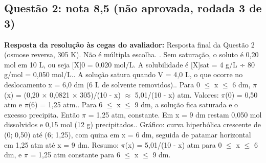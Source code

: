 \documentclass{article}%
\begin{document}
\subsection*{Questão 2: nota 8,5 (não aprovada, rodada 3 de 3)}%
\textbf{Resposta da resolução às cegas do avaliador:} Resposta final da Questão 2 (osmose reversa, 305 K). Não é múltipla escolha.\newline%
. Sem saturação, o soluto é 0,20 mol em 10 L, ou seja {[}X{]}0 = 0,020 mol/L. A solubilidade é {[}X{]}sat = 4 g/L ÷ 80 g/mol = 0,050 mol/L.. A solução satura quando V = 4,0 L, o que ocorre no deslocamento x = 6,0 dm (6 L de solvente removidos).. Para 0 $\leq$ x $\leq$ 6 dm, $\pi$(x) = (0,20 $\times$ 0,0821 $\times$ 305)/(10 - x) $\approx$ 5,01/(10 - x) atm. Valores: $\pi$(0) = 0,50 atm e $\pi$(6) = 1,25 atm.. Para 6 $\leq$ x $\leq$ 9 dm, a solução fica saturada e o excesso precipita. Então $\pi$ = 1,25 atm, constante. Em x = 9 dm restam 0,050 mol dissolvidos e 0,15 mol (12 g) precipitados.. Gráfico: curva hiperbólica crescente de (0; 0,50) até (6; 1,25), com quina em x = 6 dm, seguida de patamar horizontal em 1,25 atm até x = 9 dm.\newline%
\newline%
Resumo: $\pi$(x) = 5,01/(10 - x) atm para 0 $\leq$ x $\leq$ 6 dm, e $\pi$ = 1,25 atm constante para 6 $\leq$ x $\leq$ 9 dm.\par %
\end{document}

